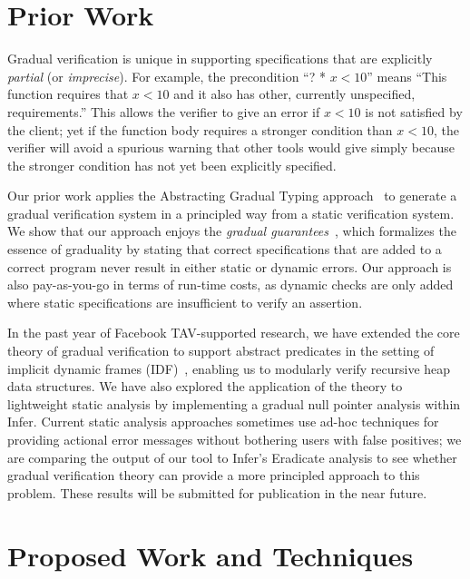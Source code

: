 \documentclass[12pt,twocolumn]{article}
\begin{document}
\begin{sloppypar}
\vspace{-2ex}
\section{Prior Work}
\vspace{-2ex}

Gradual verification is unique in supporting specifications that are explicitly \textit{partial} (or {\em imprecise}).  For example, the precondition ``? * $x<10$'' means ``This function requires that $x<10$ and it also has other, currently unspecified, requirements.''  This allows the verifier to give an error if $x<10$ is not satisfied by the client; yet if the function body requires a stronger condition than $x<10$, the verifier will avoid a spurious warning that other tools would give simply because the stronger condition has not yet been explicitly specified. 

Our prior work applies the Abstracting Gradual Typing approach~\cite{garciaAl:popl2016} to generate a gradual verification system in a principled way from a static verification system.  We show that our approach enjoys the \textit{gradual guarantees}~\cite{siekAl:snapl2015}, which formalizes the essence of graduality by stating that correct specifications that are added to a correct program never result in either static or dynamic errors.  Our approach is also pay-as-you-go in terms of run-time costs, as dynamic checks are only added where static specifications are insufficient to verify an assertion.

In the past year of Facebook TAV-supported research, we have extended the core theory of gradual verification to support abstract predicates in the setting of implicit dynamic frames (IDF)~\cite{smansAl:toplas2012}, enabling us to modularly verify recursive heap data structures.  We have also explored the application of the theory to lightweight static analysis by implementing a gradual null pointer analysis within Infer.  Current static analysis approaches sometimes use ad-hoc techniques for providing actional error messages without bothering users with false positives; we are comparing the output of our tool to Infer's Eradicate analysis to see whether gradual verification theory can provide a more principled approach to this problem.  These results will be submitted for publication in the near future.

\vspace{-2ex}
\section{Proposed Work and Techniques}
\vspace{-2ex}


\end{sloppypar}
\end{document}
